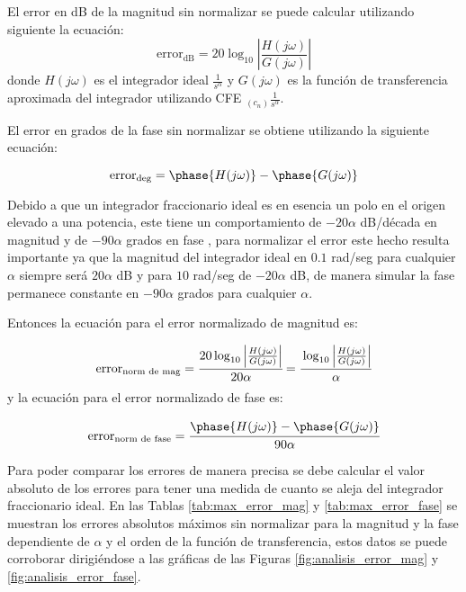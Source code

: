 	El error en dB de la magnitud sin normalizar se puede calcular utilizando siguiente la ecuación:
	\begin{equation}
	\mathrm{error}_{\mathrm{dB}} = 20\log_{10} \left| \frac{H(j\omega)}{G(j\omega)} \right|
	\label{ec:error_sin_norm}
	\end{equation}
	donde $H(j\omega)$ es el integrador ideal $\frac{1}{s^{\alpha}}$ y $G(j\omega)$ es la función de transferencia aproximada del integrador utilizando CFE $ _{(c_{n})} \frac{1}{s^{\alpha}}$. 
	
	El error en grados de la fase sin normalizar se obtiene utilizando la siguiente ecuación:
	
	\begin{equation}
	\mathrm{error}_{\mathrm{deg}} = \phase{H(j\omega)} - \phase{G(j\omega)}
	\end{equation}
	
	Debido a que un integrador fraccionario ideal es en esencia un polo en el origen elevado a una potencia, este tiene un comportamiento de $-20 \alpha$ dB/década en magnitud y de $-90\alpha$ grados en fase \cite{CharlesAlexander2016}, para normalizar el error este hecho resulta importante ya que la magnitud del integrador ideal en $0.1$ rad/seg para cualquier $\alpha$ siempre será $20 \alpha$ dB y para $10$ rad/seg de $-20 \alpha$ dB, de manera simular la fase permanece constante en $-90\alpha$ grados para cualquier $\alpha$.
	
	Entonces la ecuación para el error normalizado de magnitud es:
	
	\begin{equation}
	\mathrm{error}_{\mathrm{norm\,\,de\,\,mag}} = \cfrac{ 20\log_{10} \left| \frac{H(j\omega)}{G(j\omega)} \right| }{20 \alpha} = \cfrac{ \log_{10} \left| \frac{H(j\omega)}{G(j\omega)} \right| }{ \alpha}
	\end{equation}
	y la ecuación para el error normalizado de fase es:
	
	\begin{equation}
	\mathrm{error}_{\mathrm{norm\,\,de\,\,fase}} = \cfrac{\phase{H(j\omega)} - \phase{G(j\omega)}}{90\alpha}
	\end{equation}
	
	Para poder comparar los errores de manera precisa se debe calcular el valor absoluto de los errores para tener una medida de cuanto se aleja del integrador fraccionario ideal. En las Tablas \ref{tab:max_error_mag} y \ref{tab:max_error_fase} se muestran los errores absolutos máximos sin normalizar para la magnitud y la fase dependiente de $\alpha$ y el orden de la función de transferencia, estos datos se puede corroborar dirigiéndose a las gráficas de las Figuras \ref{fig:analisis_error_mag} y \ref{fig:analisis_error_fase}.
	
